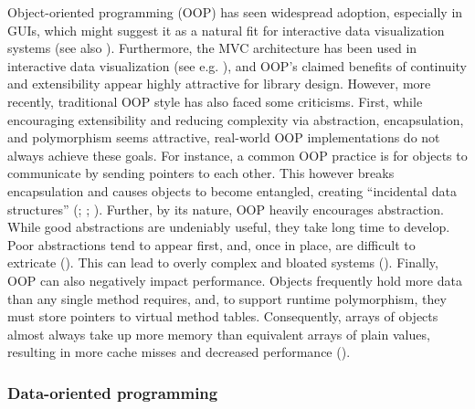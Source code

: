 \documentclass[
  openany]{book}
\theoremstyle{definition}
\theoremstyle{definition}
\theoremstyle{definition}
\theoremstyle{definition}
\theoremstyle{remark}
\begin{document}
Object-oriented programming (OOP) has seen widespread adoption, especially in GUIs, which might suggest it as a natural fit for interactive data visualization systems (see also ). Furthermore, the MVC architecture has been used in interactive data visualization (see e.g. ), and OOP's claimed benefits of continuity and extensibility appear highly attractive for library design. However, more recently, traditional OOP style has also faced some criticisms. First, while encouraging extensibility and reducing complexity via abstraction, encapsulation, and polymorphism seems attractive, real-world OOP implementations do not always achieve these goals. For instance, a common OOP practice is for objects to communicate by sending pointers to each other. This however breaks encapsulation and causes objects to become entangled, creating ``incidental data structures'' (; ; ). Further, by its nature, OOP heavily encourages abstraction. While good abstractions are undeniably useful, they take long time to develop. Poor abstractions tend to appear first, and, once in place, are difficult to extricate (). This can lead to overly complex and bloated systems (). Finally, OOP can also negatively impact performance. Objects frequently hold more data than any single method requires, and, to support runtime polymorphism, they must store pointers to virtual method tables. Consequently, arrays of objects almost always take up more memory than equivalent arrays of plain values, resulting in more cache misses and decreased performance ().

\subsubsection{Data-oriented programming}\label{dop}
\end{document}
